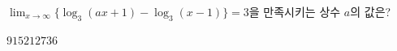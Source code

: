 $\displaystyle\lim_{x\to\infty}\{\log_3(ax+1)-\log_3(x-1)\}=3$을 만족시키는 상수 $a$의 값은?
\begin{choices32}{$9$}{$15$}{$21$}{$27$}{$36$}\end{choices32}

